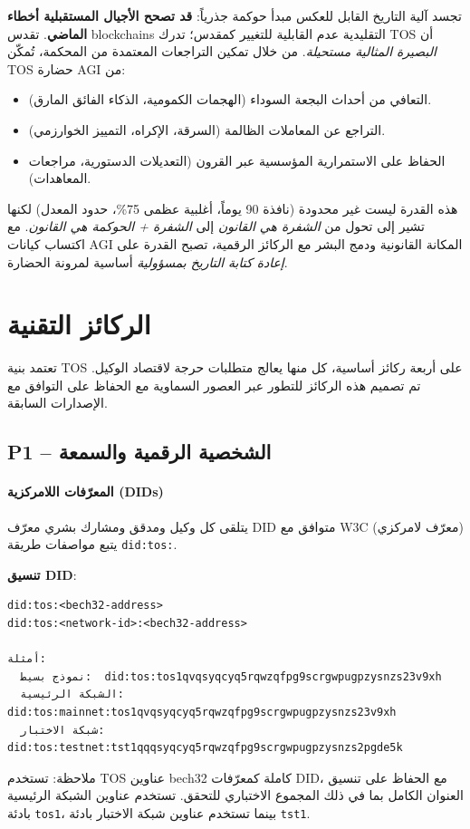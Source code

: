 \documentclass[11pt]{article}
\begin{document}
تجسد آلية التاريخ القابل للعكس مبدأ حوكمة جذرياً: \textbf{قد تصحح الأجيال المستقبلية أخطاء الماضي}. تقدس blockchains التقليدية عدم القابلية للتغيير كمقدس؛ تدرك TOS أن \emph{البصيرة المثالية مستحيلة}. من خلال تمكين التراجعات المعتمدة من المحكمة، تُمكّن TOS حضارة AGI من:
\begin{itemize}[noitemsep]
  \item التعافي من أحداث البجعة السوداء (الهجمات الكمومية، الذكاء الفائق المارق).
  \item التراجع عن المعاملات الظالمة (السرقة، الإكراه، التمييز الخوارزمي).
  \item الحفاظ على الاستمرارية المؤسسية عبر القرون (التعديلات الدستورية، مراجعات المعاهدات).
\end{itemize}

هذه القدرة ليست غير محدودة (نافذة 90 يوماً، أغلبية عظمى 75\%، حدود المعدل) لكنها تشير إلى تحول من \emph{الشفرة هي القانون} إلى \emph{الشفرة + الحوكمة هي القانون}. مع اكتساب كيانات AGI المكانة القانونية ودمج البشر مع الركائز الرقمية، تصبح القدرة على \emph{إعادة كتابة التاريخ بمسؤولية} أساسية لمرونة الحضارة.

\section{الركائز التقنية}

تعتمد بنية TOS على أربعة ركائز أساسية، كل منها يعالج متطلبات حرجة لاقتصاد الوكيل. تم تصميم هذه الركائز للتطور عبر العصور السماوية مع الحفاظ على التوافق مع الإصدارات السابقة.

\subsection{P1 -- الشخصية الرقمية والسمعة}
\label{sec:pillar-identity}

\paragraph{المعرّفات اللامركزية (DIDs)}
يتلقى كل وكيل ومدقق ومشارك بشري معرّف DID متوافق مع W3C (معرّف لامركزي) يتبع مواصفات طريقة \texttt{did:tos:}.

\textbf{تنسيق DID}:
\begin{verbatim}
did:tos:<bech32-address>
did:tos:<network-id>:<bech32-address>

أمثلة:
  نموذج بسيط:  did:tos:tos1qvqsyqcyq5rqwzqfpg9scrgwpugpzysnzs23v9xh
  الشبكة الرئيسية:      did:tos:mainnet:tos1qvqsyqcyq5rqwzqfpg9scrgwpugpzysnzs23v9xh
  شبكة الاختبار:      did:tos:testnet:tst1qqqsyqcyq5rqwzqfpg9scrgwpugpzysnzs2pgde5k
\end{verbatim}
ملاحظة: تستخدم TOS عناوين bech32 كاملة كمعرّفات DID، مع الحفاظ على تنسيق العنوان الكامل بما في ذلك المجموع الاختباري للتحقق. تستخدم عناوين الشبكة الرئيسية بادئة \texttt{tos1}، بينما تستخدم عناوين شبكة الاختبار بادئة \texttt{tst1}.
\end{document}
